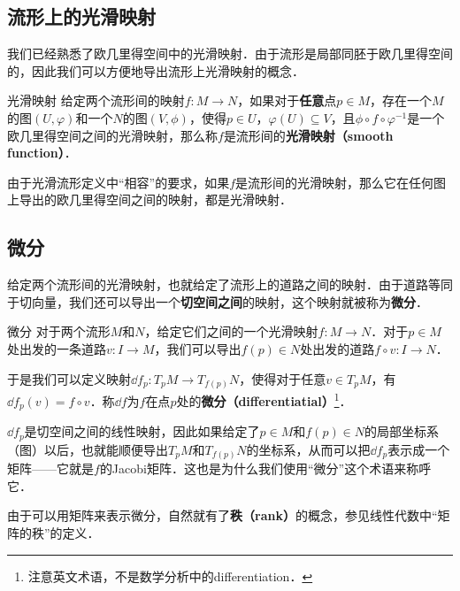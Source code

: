 

\subsection{流形上的光滑映射}

我们已经熟悉了欧几里得空间中的光滑映射．由于流形是局部同胚于欧几里得空间的，因此我们可以方便地导出流形上光滑映射的概念．

\begin{definition}{光滑映射}
给定两个流形间的映射$f:M\to N$，如果对于\textbf{任意}点$p\in M$，存在一个$M$的图$(U, \varphi)$和一个$N$的图$(V, \phi)$，使得$p\in U$，$\varphi(U)\subseteq V$，且$\phi\circ f\circ\varphi^{-1}$是一个欧几里得空间之间的光滑映射，那么称$f$是流形间的\textbf{光滑映射（smooth function）}．
\end{definition}

由于光滑流形定义中“相容”的要求，如果$f$是流形间的光滑映射，那么它在任何图上导出的欧几里得空间之间的映射，都是光滑映射．


\subsection{微分}

给定两个流形间的光滑映射，也就给定了流形上的道路之间的映射．由于道路等同于切向量，我们还可以导出一个\textbf{切空间之间}的映射，这个映射就被称为\textbf{微分}．

\begin{definition}{微分}
对于两个流形$M$和$N$，给定它们之间的一个光滑映射$f:M\to N$．对于$p\in M$处出发的一条道路$v:I\to M$，我们可以导出$f(p)\in N$处出发的道路$f\circ v:I\to N$．

于是我们可以定义映射$\dd f_p: T_pM\to T_{f(p)}N$，使得对于任意$v\in T_pM$，有$\dd f_p(v)=f\circ v$．称$\dd f$为$f$在点$p$处的\textbf{微分（differentiatial）}\footnote{注意英文术语，不是数学分析中的differentiation．}．
\end{definition}

$\dd f_p$是切空间之间的线性映射，因此如果给定了$p\in M$和$f(p)\in N$的局部坐标系（图）以后，也就能顺便导出$T_pM$和$T_{f(p)}N$的坐标系，从而可以把$\dd f_p$表示成一个矩阵——它就是$f$的Jacobi矩阵．这也是为什么我们使用“微分”这个术语来称呼它．

由于可以用矩阵来表示微分，自然就有了\textbf{秩（rank）}的概念，参见线性代数中“矩阵的秩”的定义．

